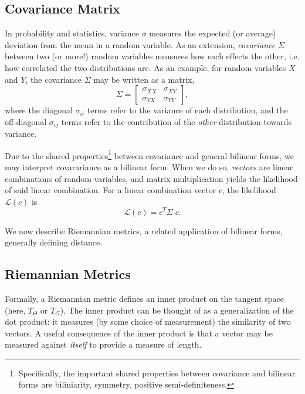 \documentclass[10pt,conference]{ieeeconf}
\begin{document}
\subsection{Covariance Matrix}
In probability and statistics, variance $\sigma$ measures the expected (or average) deviation from the mean in a random variable.
As an extension, \textit{covariance} $\Sigma$ between two (or more!) random variables measures how each effects the other, i.e. how correlated the two distributions are.
As an example, for random variables $X$ and $Y$, the covariance $\Sigma$ may be written as a matrix,
\begin{equation}
    \Sigma =
    \begin{bmatrix}
        \sigma_{XX} & \sigma_{XY} \\
        \sigma_{YX} & \sigma_{YY}
    \end{bmatrix},
\end{equation}
where the diagonal $\sigma_{ii}$ terms refer to the variance of each distribution, and the off-diagonal $\sigma_{ij}$ terms refer to the contribution of the \textit{other} distribution towards variance.

Due to the shared properties\footnote{
    Specifically, the important shared properties between covariance and bilinear forms are biliniarity, symmetry, positive semi-definiteness.
} between covariance and general bilinear forms, we may interpret covarariance as a bilinear form.
When we do so, \textit{vectors} are linear combinations of random variables, and matrix multiplication yields the likelihood of said linear combination.
For a linear combination vector $c$, the likelihood $\mathcal{L}(c)$ is
\begin{equation}
    \mathcal{L}(c) = c^T \Sigma \; c.
\end{equation}

We now describe Riemannian metrics, a related application of bilinear forms, generally defining distance.

\subsection{Riemannian Metrics}
Formally, a Riemannian metric defines an inner product on the tangent space (here, $T_\Theta$ or $T_G$).
The inner product can be thought of as a generalization of the dot product: it measures (by some choice of measurement) the similarity of two vectors.
A useful consequence of the inner product is that a vector may be measured against \textit{itself} to provide a measure of length.
\end{document}
